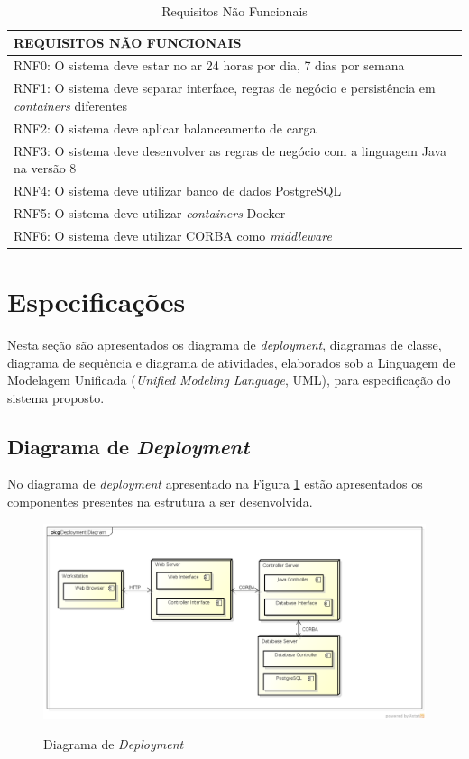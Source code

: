 	\begin{table}[!h]
		\caption{Requisitos Não Funcionais}
		\label{Req-Nao-Func}
		\begin{tabular}{|l|}
			\hline
			\textbf{REQUISITOS NÃO FUNCIONAIS} \\ \hline
			RNF0: O sistema deve estar no ar 24 horas por dia, 7 dias por semana \\ \hline
			RNF1: O sistema deve separar interface, regras de negócio e persistência em \textit{containers} diferentes \\ \hline
			RNF2: O sistema deve aplicar balanceamento de carga \\ \hline
			RNF3: O sistema deve desenvolver as regras de negócio com a linguagem Java na versão 8\\ \hline
			RNF4: O sistema deve utilizar banco de dados PostgreSQL \\ \hline
			RNF5: O sistema deve utilizar \textit{containers} Docker \\ \hline
			RNF6: O sistema deve utilizar CORBA como \textit{middleware} \\ \hline
		\end{tabular}
	\end{table}

\section{Especificações}
	Nesta seção são apresentados os diagrama de \textit{deployment}, diagramas de classe, diagrama de sequência e diagrama de atividades, elaborados sob a Linguagem de Modelagem Unificada (\textit{Unified Modeling Language}, UML), para especificação do sistema proposto.
	
\subsection{Diagrama de \textit{Deployment}}
	No diagrama de \textit{deployment} apresentado na Figura \ref{Diagrama-Deployment} estão apresentados os componentes presentes na estrutura a ser desenvolvida.
	
	\begin{figure}[htb]
		\caption{Diagrama de \textit{Deployment}}
		{\parbox{6cm}{
				\includegraphics[width=14cm]{images/DeploymentDiagram.png}
				\label{Diagrama-Deployment}
		}}
	\end{figure}

